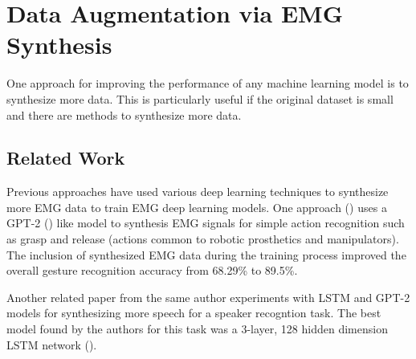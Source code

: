 \section{Data Augmentation via EMG Synthesis}

One approach for improving the performance of any machine learning model
is to synthesize more data. This is particularly useful if the original
dataset is small and there are methods to synthesize more data.

\subsection{Related Work}

Previous approaches have used various deep learning techniques to synthesize
more EMG data to train EMG deep learning models. One approach
(\cite{gpt_2_emg_synth}) uses a GPT-2 (\cite{gpt_2_original}) like model
to synthesis EMG signals for simple action recognition such as grasp and
release (actions common to robotic prosthetics and manipulators). The inclusion
of synthesized EMG data during the training process improved the overall
gesture recognition accuracy from 68.29\% to 89.5\%.

Another related paper from the same author experiments with LSTM and GPT-2
models for synthesizing more speech for a speaker recogntion task. The
best model found by the authors for this task was a
3-layer, 128 hidden dimension LSTM network (\cite{speech_synth_lstm}).